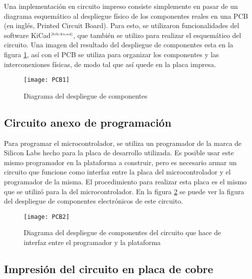 Una implementaci\'on en circuito impreso consiste simplemente en pasar de un diagrama esquem\'atico al despliegue f\'isico de los componentes reales en una PCB (en ingl\'es, Printed Circuit Board). Para esto, se utilizaron funcionalidades del software KiCad$^{\tiny{\cite{bib:kicad}}}$, que tambi\'en se utilizo para realizar el esquem\'atico del circuito. Una imagen del resultado del despliegue de componentes esta en la figura \ref{fig:PCB1}, as\'i con el PCB se utiliza para organizar los componentes y las interconexiones f\'isicas, de modo tal que as\'i quede en la placa impresa.

\begin{figure}[H]
  \centering
  \texttt{[image: PCB1]}
  \caption{\small Diagrama del despliegue de componentes}\label{fig:PCB1}
\end{figure}


\subsection{Circuito anexo de programaci\'on} %
\label{sub:circuito_anexo_de_programacion}

Para programar el microcontrolador, se utiliza un programador de la marca de Silicon Labs hecho para la placa de desarrollo utilizada. Es posible usar este mismo programador en la plataforma a construir, pero es necesario armar un circuito que funcione como interfaz entre la placa del microcontrolador y el programador de la misma. El procedimiento para realizar esta placa es el mismo que se utiliz\'o para la del microcontrolador. En la figura \ref{fig:PCB2} se puede ver la figura del despliegue de componentes electr\'onicos de este circuito.

\begin{figure}[H]
  \centering
  \texttt{[image: PCB2]}
  \caption{\small Diagrama del despliegue de componentes del circuito que hace de interfaz entre el programador y la plataforma}\label{fig:PCB2}
\end{figure}


\subsection{Impresi\'on del circuito en placa de cobre} %
\label{sub:impresion_del_circuito_en_placa_de_cobre}

